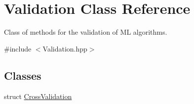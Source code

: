 \hypertarget{class_validation}{}\section{Validation Class Reference}
\label{class_validation}


Class of methods for the validation of ML algorithms.  




{\ttfamily \#include $<$Validation.\+hpp$>$}

\subsection*{Classes}
\begin{DoxyCompactItemize}
\item 
struct \hyperlink{struct_validation_1_1_cross_validation}{Cross\+Validation}
\end{DoxyCompactItemize}
